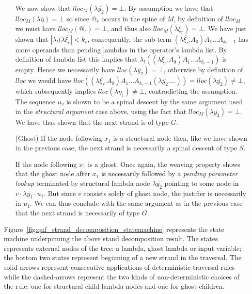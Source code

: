 \documentclass{article}
\theoremstyle{definition}
\begin{document}
\begin{enumerate}
We now show that $lloc_M(\lambda\overline{y_2})=\bot$.
By assumption we have that $lloc_M(\lambda\overline{\eta}) =\bot$ so since $@_r$ occurs in the spine of $M$, by definition of $lloc_M$ we must have $lloc_M(@_r) =\bot$, and thus also $lloc_M(\lambda\overline{\xi_r}) = \bot$. We have just shown that $|\lambda_l(\lambda\overline{\xi_r}| < k_r$, consequently, the sub-term $(\lambda\overline{\xi_r} . A_0) A_1 \ldots A_{k_r-1}$ has more operands than pending lambdas in the operator's lambda list. By definition of lambda list this implies that $\lambda_l((\lambda\overline{\xi_r} . A_0) A_1 \ldots A_{k_r-1})$ is empty. Hence we necessarily have $lloc(\lambda\overline{y_2}) = \bot$, otherwise by definition of $lloc$ we would have
 $lloc((\lambda\overline{\xi_r} . A_0) A_1 \ldots A_{k_r-1} (\lambda\overline{y_2}. \ldots)) = lloc(\lambda\overline{y_2}) \ne \bot$, which subsequently implies $lloc(\lambda\overline{\eta_1})\ne\bot$, contradicting the assumption.
The sequence $u_2$ is shown to be a spinal descent by the same argument used in the \emph{structural argument} case above, using the fact that $lloc_M(\lambda\overline{y_2})=\bot$. We have thus shown that the next strand is of type $G$.

\item[(Ghost)] If the node following $x_1$ is a structural node then, like we have shown in the previous case, the next strand is necessarily a spinal descent of type $S$.

If the node following $x_1$ is a ghost.
Once again, the weaving property shows that the ghost node after $x_1$ is necessarily followed by a \emph{pending parameter lookup} terminated by structural lambda node $\lambda\overline{y_2}$ pointing to some node in $v \cdot \lambda\overline{y_1} \cdot u_1$.
But since $v$ consists solely of ghost node, the justifier is necessarily in $u_1$. We can thus conclude with the same argument as in the previous case that the next strand is necessarily of type
$G$.
\end{enumerate}
\endproofatend

Figure~\ref{fig:qnf_strand_decomposition_statemachine} represents the state machine underpinning the above stand decomposition result. The states represents external nodes of the tree: a lambda, ghost lambda or input variable; the bottom two states represent beginning of a new strand in the traversal.
The solid-arrows represent consecutive applications of deterministic traversal rules while the dashed-arrows represent the two kinds of non-deterministic choices of the  rule: one for structural child lambda nodes and one for ghost children.
\end{document}
